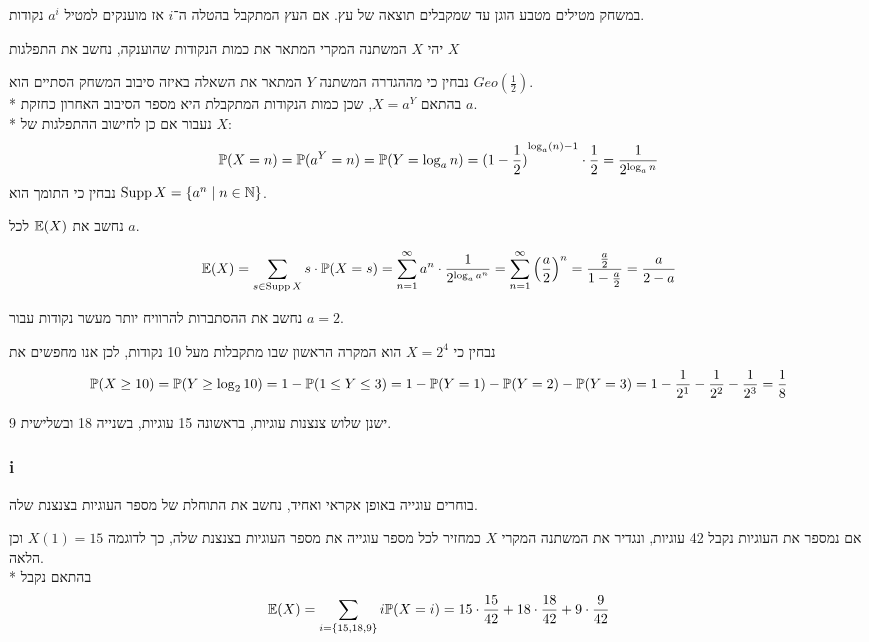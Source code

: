 \question{}
במשחק מטילים מטבע הוגן עד שמקבלים תוצאה של עץ. אם העץ המתקבל בהטלה ה־$i$ אז מוענקים למטיל $a^i$ נקודות.

\subquestion{}
יהי $X$ המשתנה המקרי המתאר את כמות הנקודות שהוענקה, נחשב את התפלגות $X$
\begin{solution}
	נבחין כי מההגדרה המשתנה $Y$ המתאר את השאלה באיזה סיבוב המשחק הסתיים הוא $Geo(\frac{1}{2})$. \\*
	בהתאם $X = a^Y$, שכן כמות הנקודות המתקבלת היא מספר הסיבוב האחרון כחזקת $a$. \\*
	נעבור אם כן לחישוב ההתפלגות של $X$:
	\[
		\mathbb{P}(X = n)
		= \mathbb{P}(a^Y = n)
		= \mathbb{P}(Y = \log_a n)
		= {(1 - \frac{1}{2})}^{\log_a(n) - 1} \cdot \frac{1}{2}
		= \frac{1}{2^{\log_a n}}
	\]
	נבחין כי התומך הוא $\operatorname{Supp} X = \{ a^n \mid n \in \mathbb{N} \}$.
\end{solution}

\subquestion{}
נחשב את $\mathbb{E}(X)$ לכל $a$.
\begin{solution}
	\[
		\mathbb{E}(X)
		= \sum_{s \in \operatorname{Supp} X} s \cdot \mathbb{P}(X = s)
		= \sum_{n = 1}^\infty a^n \cdot \frac{1}{2^{\log_a a^n}}
		= \sum_{n = 1}^\infty {\left(\frac{a}{2}\right)}^n
		= \frac{\frac{a}{2}}{1 - \frac{a}{2}}
		= \frac{a}{2 - a}
	\]
\end{solution}

\subquestion{}
נחשב את ההסתברות להרוויח יותר מעשר נקודות עבור $a = 2$.
\begin{solution}
	נבחין כי $X = 2^4$ הוא המקרה הראשון שבו מתקבלות מעל 10 נקודות, לכן אנו מחפשים את
	\[
		\mathbb{P}(X \ge 10) = \mathbb{P}(Y \ge \log_2 10) = 1 - \mathbb{P}(1 \le Y \le 3) = 1 - \mathbb{P}(Y = 1) - \mathbb{P}(Y = 2) - \mathbb{P}(Y = 3) = 1 - \frac{1}{2^1} - \frac{1}{2^2} - \frac{1}{2^3} = \frac{1}{8}
	\]
\end{solution}

\question{}
\subquestion{}
ישנן שלוש צנצנות עוגיות, בראשונה 15 עוגיות, בשנייה 18 ובשלישית 9.

\subsubsection{i}
בוחרים עוגייה באופן אקראי ואחיד, נחשב את התוחלת של מספר העוגיות בצנצנת שלה.
\begin{solution}
	אם נמספר את העוגיות נקבל 42 עוגיות, ונגדיר את המשתנה המקרי $X$ כמחזיר לכל מספר עוגייה את מספר העוגיות בצנצנת שלה, כך לדוגמה $X(1) = 15$ וכן הלאה. \\*
	בהתאם נקבל
	\[
		\mathbb{E}(X)
		= \sum_{i = \{15, 18, 9\}} i \mathbb{P}(X = i)
		= 15 \cdot \frac{15}{42} + 18 \cdot \frac{18}{42} + 9 \cdot \frac{9}{42}
	\]
\end{solution}

